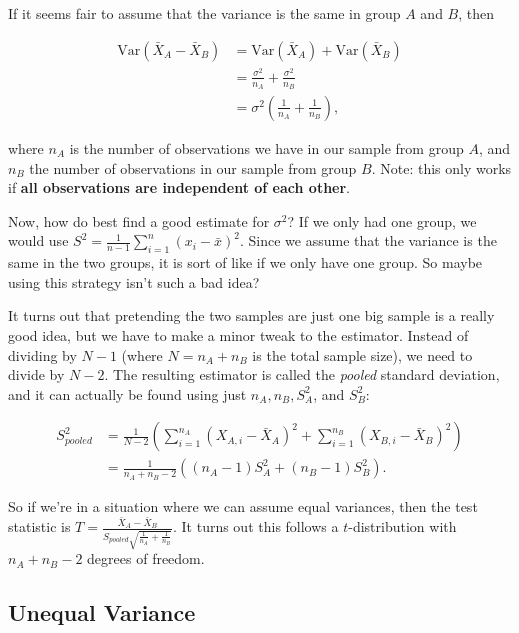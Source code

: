 \documentclass[]{book}
\theoremstyle{definition}
\theoremstyle{definition}
\theoremstyle{definition}
\theoremstyle{remark}
\begin{document}
If it seems fair to assume that the variance is the same in group \(A\) and \(B\), then

\begin{align*}
  \text{Var}(\bar{X}_A - \bar{X}_B) &= \text{Var}(\bar{X}_A) + \text{Var}(\bar{X}_B) \\
                              &= \frac{\sigma^2}{n_A} + \frac{\sigma^2}{n_B} \\
                              &= \sigma^2 \left(\frac{1}{n_A} + \frac{1}{n_B}\right),
\end{align*}

where \(n_A\) is the number of observations we have in our sample from group \(A\), and \(n_B\) the number of observations in our sample from group \(B\). Note: this only works if \textbf{all observations are independent of each other}.

Now, how do best find a good estimate for \(\sigma^2\)? If we only had one group, we would use \(S^2 = \frac{1}{n-1}\sum_{i=1}^n (x_i - \bar{x})^2\). Since we assume that the variance is the same in the two groups, it is sort of like if we only have one group. So maybe using this strategy isn't such a bad idea?

It turns out that pretending the two samples are just one big sample is a really good idea, but we have to make a minor tweak to the estimator. Instead of dividing by \(N-1\) (where \(N = n_A + n_B\) is the total sample size), we need to divide by \(N-2\). The resulting estimator is called the \emph{pooled} standard deviation, and it can actually be found using just \(n_A, n_B, S_A^2\), and \(S_B^2\):

\begin{align*}
  S_{pooled}^2 &= \frac{1}{N - 2}\left(\sum_{i = 1}^{n_A}(X_{A,i} - \bar{X}_A)^2 + \sum_{i=1}^{n_B}(X_{B,i} - \bar{X}_B)^2\right) \\
               &= \frac{1}{n_A + n_B - 2}\left((n_A - 1) S_A^2 + (n_B - 1) S_B^2 \right).
\end{align*}

So if we're in a situation where we can assume equal variances, then the test statistic is \(T = \frac{\bar{X}_A - \bar{X}_B}{S_{pooled}\sqrt{\frac{1}{n_A} + \frac{1}{n_B}}}\). It turns out this follows a \(t\)-distribution with \(n_A + n_B - 2\) degrees of freedom.

\hypertarget{unequal-variance}{%
\subsection{Unequal Variance}\label{unequal-variance}}
\end{document}
